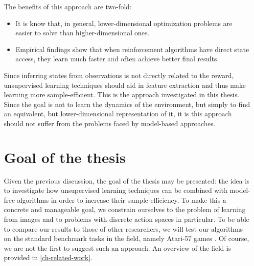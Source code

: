 The benefits of this approach are two-fold:
 \begin{itemize}
    \item It is know that, in general, lower-dimensional optimization 
			problems are easier to solve than higher-dimensional ones.
    \item Empirical findings show that when reinforcement algorithms have direct state access, 
			they learn much faster and often achieve better final results.
\end{itemize}
Since inferring states from observations is not directly related to the reward,
unsupervised learning techniques should aid in 
feature extraction and thus make learning more sample-efficient.
This is the approach investigated in this thesis.
Since the goal is not to learn the dynamics of the environment,
but simply to find an equivalent, but lower-dimensional representation of it,
it is this approach should not suffer from the problems faced
by model-based approaches.


\section{Goal of the thesis}
\label{sec-thesis-goal}
Given the previous discussion, the goal of the thesis may be presented:
the idea is to investigate how unsupervised learning techniques can be combined
with model-free algorithms in order to increase their sample-efficiency.
To make this a concrete and manageable goal,
we constrain ourselves to the problem of learning from images and to problems
with discrete action spaces in particular.
To be able to compare our results to those of other researchers,
we will test our algorithms on the standard benchmark tasks in the field,
namely Atari-57 games \cite{bellemare13arcade}.
Of course, we are not the first to suggest such an approach.
An overview of the field is provided in \ref{ch-related-work}.


